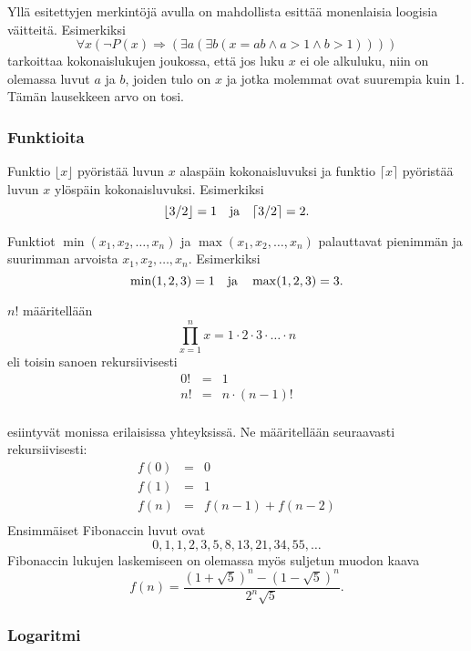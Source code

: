 Yllä esitettyjen merkintöjä avulla on mahdollista esittää
monenlaisia loogisia väitteitä.
Esimerkiksi
\[\forall x (\lnot P(x) \Rightarrow (\exists a (\exists b (x = ab \land a > 1 \land b > 1))))\]
tarkoittaa kokonaislukujen joukossa, että jos luku $x$ ei ole alkuluku,
niin on olemassa luvut $a$ ja $b$,
joiden tulo on $x$ ja jotka molemmat ovat suurempia kuin 1.
Tämän lausekkeen arvo on tosi.

\subsubsection{Funktioita}

Funktio $\lfloor x \rfloor$ pyöristää luvun $x$
alaspäin kokonaisluvuksi ja
funktio $\lceil x \rceil$ pyöristää luvun $x$
ylöspäin kokonaisluvuksi. Esimerkiksi
\[ \lfloor 3/2 \rfloor = 1 \hspace{10px} \textrm{ja} \hspace{10px} \lceil 3/2 \rceil = 2.\]

Funktiot $\min(x_1,x_2,\ldots,x_n)$
ja $\max(x_1,x_2,\ldots,x_n)$
palauttavat pienimmän ja suurimman
arvoista $x_1,x_2,\ldots,x_n$.
Esimerkiksi
\[ \min(1,2,3)=1 \hspace{10px} \textrm{ja} \hspace{10px} \max(1,2,3)=3.\]


 $n!$ määritellään
\[\prod_{x=1}^n x = 1 \cdot 2 \cdot 3 \cdot \ldots \cdot n\]
eli toisin sanoen rekursiivisesti
\[
\begin{array}{lcl}
0! & = & 1 \\
n! & = & n \cdot (n-1)! \\
\end{array}
\]


 esiintyvät monissa erilaisissa yhteyksissä.
Ne määritellään seuraavasti rekursiivisesti:
\[
\begin{array}{lcl}
f(0) & = & 0 \\
f(1) & = & 1 \\
f(n) & = & f(n-1)+f(n-2) \\
\end{array}
\]
Ensimmäiset Fibonaccin luvut ovat
\[0, 1, 1, 2, 3, 5, 8, 13, 21, 34, 55, \ldots\]
Fibonaccin lukujen laskemiseen on olemassa myös
suljetun muodon kaava
\[f(n)=\frac{(1 + \sqrt{5})^n - (1-\sqrt{5})^n}{2^n \sqrt{5}}.\]

\subsubsection{Logaritmi}

